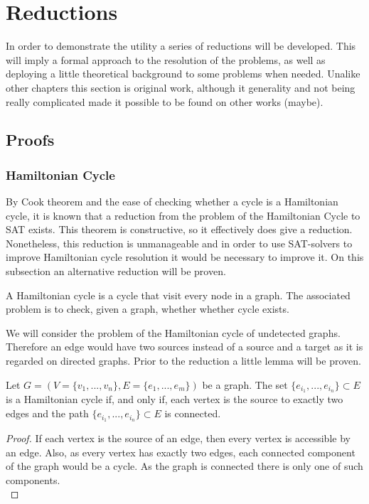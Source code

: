
\chapter{Reductions} %


In order to demonstrate the utility a series of reductions will be developed. This will imply a formal approach to the resolution of the problems, as well as deploying a little theoretical background to some problems when needed. Unalike other chapters this section is original work, although it generality and not being really complicated made it possible to be found on other works (maybe). 

\section{Proofs}

\subsection{Hamiltonian Cycle}



By Cook theorem and the ease of checking whether a cycle is a Hamiltonian cycle, it is known that a reduction from the problem of the Hamiltonian Cycle to SAT exists. This theorem is constructive, so it effectively does give a reduction. Nonetheless, this reduction is unmanageable and in order to use SAT-solvers to improve Hamiltonian cycle resolution it would be necessary to improve it. On this subsection an alternative reduction will be proven.

\begin{definition}
  A Hamiltonian cycle is a cycle that visit every node in a graph. The associated problem is to check, given a graph, whether whether cycle exists.
\end{definition}

We will consider the problem of the Hamiltonian cycle of undetected graphs. Therefore an edge would have two sources instead of a source and a target as it is regarded on directed graphs. Prior to the reduction a little lemma will be proven. 

\begin{lemma} Let $G=(V=\{ v_1,...,v_n\},E= \{e_1,...,e_m\})$ be a graph. The set $ \{e_{i_1},...,e_{i_n}\}\subset E$ is a Hamiltonian cycle if, and only if, each vertex is the source to exactly two edges and the path  $ \{e_{i_1},...,e_{i_n}\}\subset E$ is connected.

  \begin{proof}
	  If each vertex is the source of an edge, then every vertex is accessible by an edge. Also, as every vertex has exactly two edges, each connected component of the graph would be a cycle. As the graph is connected there is only one of such components.\\
  \end{proof}
	
\end{lemma}


